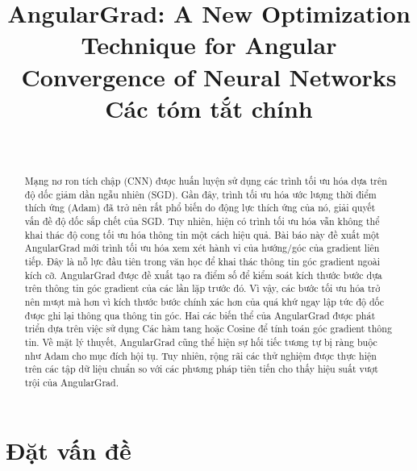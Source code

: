 \documentclass{IEEEtran}
\begin{document}
\title{AngularGrad: A New Optimization Technique for Angular Convergence of Neural Networks \\
\vspace{1cm}
    Các tóm tắt chính
}

\author{
    \\
}

\maketitle

\begin{abstract}
    Mạng nơ ron tích chập (CNN) được huấn luyện
    sử dụng các trình tối ưu hóa dựa trên độ dốc giảm dần ngẫu nhiên (SGD). Gần đây, trình tối ưu hóa ước lượng thời điểm thích ứng (Adam) đã
    trở nên rất phổ biến do động lực thích ứng của nó,
    giải quyết vấn đề độ dốc sắp chết của SGD. Tuy nhiên, hiện có
    trình tối ưu hóa vẫn không thể khai thác độ cong tối ưu hóa
    thông tin một cách hiệu quả. Bài báo này đề xuất một AngularGrad mới
    trình tối ưu hóa xem xét hành vi của hướng/góc của
    gradient liên tiếp. Đây là nỗ lực đầu tiên trong văn học
    để khai thác thông tin góc gradient ngoài
    kích cỡ. AngularGrad được đề xuất tạo ra điểm số để
    kiểm soát kích thước bước dựa trên thông tin góc gradient
    của các lần lặp trước đó. Vì vậy, các bước tối ưu hóa trở nên
    mượt mà hơn vì kích thước bước chính xác hơn của quá khứ ngay lập tức
    độ dốc được ghi lại thông qua thông tin góc. Hai
    các biến thể của AngularGrad được phát triển dựa trên việc sử dụng
    Các hàm tang hoặc Cosine để tính toán góc gradient
    thông tin. Về mặt lý thuyết, AngularGrad cũng thể hiện sự hối tiếc tương tự
    bị ràng buộc như Adam cho mục đích hội tụ. Tuy nhiên, rộng rãi
    các thử nghiệm được thực hiện trên các tập dữ liệu chuẩn so với các phương pháp tiên tiến cho thấy hiệu suất vượt trội của AngularGrad.
\end{abstract}

\begin{IEEEkeywords}
    
\end{IEEEkeywords}

\section{Đặt vấn đề}


\printbibliography[heading=bibintoc, title = {Tài liệu tham khảo}]
\end{document}
